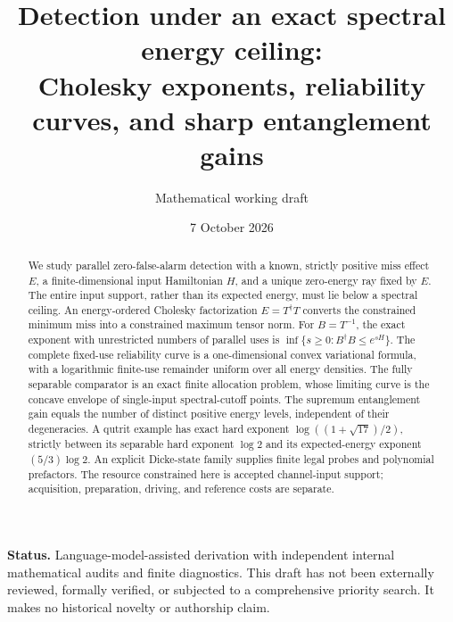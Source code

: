 \documentclass[11pt,a4paper]{article}
\title{Detection under an exact spectral energy ceiling:\\
Cholesky exponents, reliability curves, and sharp entanglement gains}
\author{Mathematical working draft}
\date{7 October 2026}
\theoremstyle{remark}
\begin{document}
\maketitle
\begin{center}
\begin{minipage}{0.94\linewidth}
\small
\textbf{Status.} Language-model-assisted derivation with independent internal
mathematical audits and finite diagnostics. This draft has not been externally
reviewed, formally verified, or subjected to a comprehensive priority search.
It makes no historical novelty or authorship claim.
\end{minipage}
\end{center}
\begin{abstract}
We study parallel zero-false-alarm detection with a known, strictly positive
miss effect \(E\), a finite-dimensional input Hamiltonian \(H\), and a unique
zero-energy ray fixed by \(E\). The entire input support, rather than its
expected energy, must lie below a spectral ceiling. An energy-ordered
Cholesky factorization \(E=T^\dagger T\) converts the constrained minimum
miss into a constrained maximum tensor norm. For \(B=T^{-1}\), the exact
exponent with unrestricted numbers of parallel uses is
\(\inf\{s\geq0:B^\dagger B\leq e^{sH}\}\).
The complete fixed-use reliability curve is a one-dimensional convex
variational formula, with a logarithmic finite-use remainder uniform over
all energy densities. The fully separable comparator is an exact finite
allocation problem, whose limiting curve is the concave envelope of
single-input spectral-cutoff points. The supremum entanglement gain equals
the number of distinct positive energy levels, independent of their
degeneracies. A qutrit example has exact hard exponent
\(\log((1+\sqrt{17})/2)\), strictly between its separable hard exponent
\(\log2\) and its expected-energy exponent \((5/3)\log2\).
An explicit Dicke-state family supplies finite legal probes and polynomial
prefactors. The resource constrained here is accepted channel-input support;
acquisition, preparation, driving, and reference costs are separate.
\end{abstract}
\end{document}
